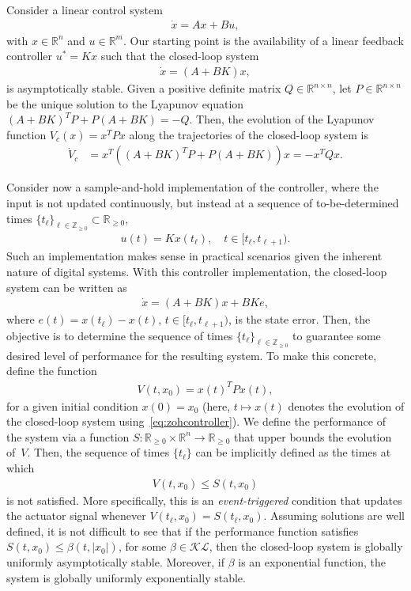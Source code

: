 \documentclass[]{book}
\newcommand{\real}{{\mathbb{R}}}
\newcommand{\realnonnegative}{\mathbb{R}_{\ge 0}}
\newcommand{\integernonnegative}{\mathbb{Z}_{\ge 0}}
\newcommand{\KL}{{\mathcal{KL}}}
\begin{document}
Consider a linear control system
\begin{align}\label{eq:lindynamics}
  \dot{x} = Ax + Bu,
\end{align}
with $ x \in \real^n$ and $u \in \real^m$. Our starting point
is the availability of a linear feedback controller $u^* = Kx$ such that the closed-loop system
\begin{align*}
  \dot{x} = (A+BK)x ,
\end{align*}
is asymptotically stable. Given a positive definite matrix $Q \in
\real^{n \times n}$, let $P \in \real^{n \times n}$ be the unique
solution to the Lyapunov equation $ (A+BK)^T P + P(A+BK) = -Q$. Then,
the evolution of the Lyapunov function $ V_c(x) = x^T P x$
along the trajectories of the closed-loop system is
\begin{align*}
  \dot{V}_c &= x^T ( (A+BK)^T P + P(A+BK) ) x = -x^T Q x.
\end{align*}

Consider now a sample-and-hold implementation of the controller, where
the input is not updated continuously, but instead at a sequence of
to-be-determined times $\{ t_\ell \}_{\ell \in \integernonnegative}
\subset \realnonnegative$,
\begin{align}\label{eq:zohcontroller}
  u(t) = Kx(t_\ell) , \quad t \in [t_\ell, t_{\ell+1} ).
\end{align}
Such an implementation makes sense in practical scenarios given the
inherent nature of digital systems. With this controller
implementation, the closed-loop system can be written as
\begin{align*}
  \dot{x} = (A+BK)x + BKe,
\end{align*}
where $ e(t) = x(t_\ell) - x(t)$, $ t \in [t_\ell, t_{\ell+1} )$, is
the state error. Then, the objective is to determine the sequence 
of times $\{t_\ell \}_{\ell \in \integernonnegative}$ to 
guarantee some desired level of performance for the
resulting system. To make this concrete, define the function
\begin{align*}
  V(t,x_0) = x(t)^T P x(t) ,
\end{align*}
for a given initial condition $x(0) = x_0$ (here, $t\mapsto x(t)$
denotes the evolution of the closed-loop system
using~\eqref{eq:zohcontroller}). We define the performance of the
system via a function $S : \realnonnegative \times \real^n
\rightarrow \realnonnegative$ that upper bounds the evolution
of~$V$. Then, the sequence of times $\{ t_\ell \}$ can be
implicitly defined as the times at which
\begin{align}\label{eq:trigger}
  V(t,x_0) \leq S(t,x_0)
\end{align}
is not satisfied. More specifically, this is an \emph{event-triggered} condition
that updates the actuator signal whenever $V(t_\ell, x_0) = S(t_\ell,
x_0)$. Assuming solutions are well defined, it is not difficult to
see that if the performance function satisfies $S(t,x_0) \leq
\beta(t,|x_0|)$, for some $\beta \in \KL$, then the closed-loop system
is globally uniformly asymptotically stable. Moreover, if $\beta$ is
an exponential function, the system is globally uniformly
exponentially stable.
\end{document}
